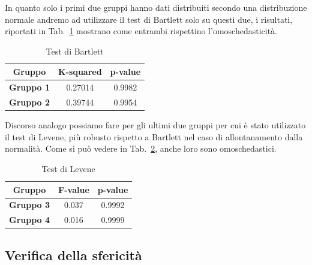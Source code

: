 \documentclass[conference]{IEEEtran}
\begin{document}
In quanto solo i primi due gruppi hanno dati distribuiti secondo una distribuzione normale
andremo ad utilizzare il test di Bartlett solo su questi due, i risultati,
riportati in Tab.~\ref{tab2} mostrano come entrambi rispettino l'omoschedasticità.
\begin{table}[htbp]
    \caption{Test di Bartlett}
    \begin{center}
    \begin{tabular}{|c|c|c|}
    \hline
    \textbf{Gruppo} & \textbf{K-squared} & \textbf{p-value} \\
    \hline
    \textbf{Gruppo 1} & 0.27014 & 0.9982 \\\cline{1-3}
    \textbf{Gruppo 2} & 0.39744 & 0.9954 \\\cline{1-3}
    \hline
    \end{tabular}
    \label{tab2}
    \end{center}
\end{table}

Discorso analogo possiamo fare per gli ultimi due gruppi per cui è stato utilizzato il test di
Levene, più robusto rispetto a Bartlett nel caso di allontanamento dalla normalità.
Come si può vedere in Tab.~\ref{tab3}, anche loro sono omoschedastici.
\begin{table}[htbp]
    \caption{Test di Levene}
    \begin{center}
    \begin{tabular}{|c|c|c|}
    \hline
    \textbf{Gruppo} & \textbf{F-value} & \textbf{p-value} \\
    \hline
    \textbf{Gruppo 3} & 0.037 & 0.9992 \\\cline{1-3}
    \textbf{Gruppo 4} & 0.016 & 0.9999 \\\cline{1-3}
    \hline
    \end{tabular}
    \label{tab3}
    \end{center}
\end{table}

\subsection{Verifica della sfericità}
\end{document}
